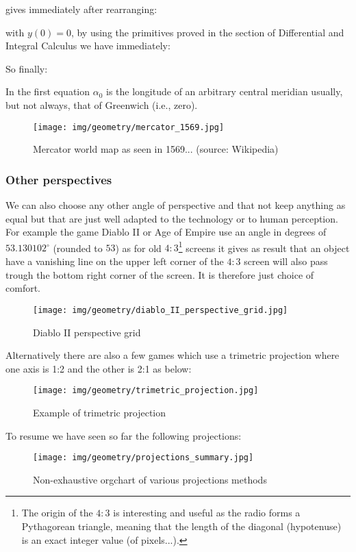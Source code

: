  	gives immediately after rearranging:
	
	with $y(0) = 0$, by using the primitives proved in the section of Differential and Integral Calculus we have immediately:
	
	So finally:
	
	In the first equation $\alpha_0$ is the longitude of an arbitrary central meridian usually, but not always, that of Greenwich (i.e., zero).
	
	\begin{figure}[H]
		\centering
		\texttt{[image: img/geometry/mercator\_1569.jpg]}
		\caption{Mercator world map as seen in 1569... (source: Wikipedia)}
	\end{figure}
	
	\subsubsection{Other perspectives}
	We can also choose any other angle of perspective and that not keep anything as equal but that are just well adapted to the technology or to human perception. For example the game Diablo II or Age of Empire use an angle in degrees of $53.130102^\circ$ (rounded to $53$) as for old $4:3$\footnote{The origin of the $4:3$ is interesting and useful as the radio forms a Pythagorean triangle, meaning that the length of the diagonal (hypotenuse) is an exact integer value (of pixels...).} screens it gives as result that an object have a vanishing line on the upper left corner of the $4:3$ screen will also pass trough the bottom right corner of the screen. It is therefore just choice of comfort.
	\begin{figure}[H]
		\centering
		\texttt{[image: img/geometry/diablo\_II\_perspective\_grid.jpg]}
		\caption[]{Diablo II perspective grid}
	\end{figure}
	Alternatively there are also a few games which use a trimetric projection where one axis is 1:2 and the other is 2:1 as below:
	\begin{figure}[H]
		\centering
		\texttt{[image: img/geometry/trimetric\_projection.jpg]}
		\caption[]{Example of trimetric projection}
	\end{figure}
	To resume we have seen so far the following projections:
	\begin{figure}[H]
		\centering
		\texttt{[image: img/geometry/projections\_summary.jpg]}
		\caption{Non-exhaustive orgchart of various projections methods}
	\end{figure}
	
